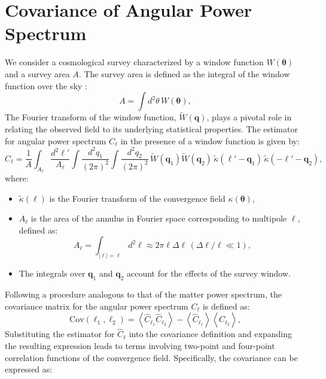 \section{Covariance of Angular Power Spectrum}
We consider a cosmological survey characterized by a window function  $W(\boldsymbol{\theta})$ and a survey area \( A \). The survey area is defined as the integral of the window function over the sky \citep{PhysRevD.87.123504}:
\begin{equation}
    A = \int d^2 \theta \, W(\boldsymbol{\theta}),
\end{equation}
The Fourier transform of the window function, \( \tilde{W}(\mathbf{q}) \), plays a pivotal role in relating the observed field to its underlying statistical properties.
The estimator for angular power spectrum \( C_\ell \) in the presence of a window function is given by:
\begin{equation}
    \hat{C}_\ell = \frac{1}{A} \int_{A_\ell} \frac{d^2 \ell'}{A_\ell} \int \frac{d^2 q_1}{(2\pi)^2} \int \frac{d^2 q_2}{(2\pi)^2} \, \tilde{W}(\mathbf{q}_1) \tilde{W}(\mathbf{q}_2) \, \tilde{\kappa}(\mathbf{\ell}' - \mathbf{q}_1) \, \tilde{\kappa}(-\mathbf{\ell}' - \mathbf{q}_2),
\end{equation}
where:
\begin{itemize}
    \item \( \tilde{\kappa}(\mathbf{\ell}) \) is the Fourier transform of the convergence field \( \kappa(\boldsymbol{\theta}) \),
    \item \( A_\ell \) is the area of the annulus in Fourier space corresponding to multipole \( \ell \), defined as:
    \begin{equation}
        A_\ell = \int_{|\mathbf{\ell}| = \ell} d^2 \mathbf{\ell} \approx 2 \pi \ell \Delta \ell \, (\Delta \ell / \ell \ll 1),
    \end{equation}
    \item The integrals over \( \mathbf{q}_1 \) and \( \mathbf{q}_2 \) account for the effects of the survey window.
\end{itemize}
Following a procedure analogous to that of the matter power spectrum, the covariance matrix for the angular power spectrum \( C_\ell \) is defined as:
\begin{equation}
    \mathrm{Cov}(\ell_1, \ell_2) = \left\langle \hat{C}_{\ell_1} \hat{C}_{\ell_2} \right\rangle - \left\langle \hat{C}_{\ell_1} \right\rangle \left\langle \hat{C}_{\ell_2} \right\rangle,
\end{equation}
Substituting the estimator for \( \hat{C}_\ell \) into the covariance definition and expanding the resulting expression leads to terms involving two-point and four-point correlation functions of the convergence field. Specifically, the covariance can be expressed as:
